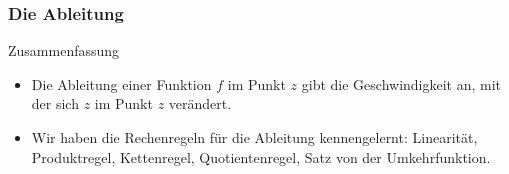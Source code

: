 \documentclass{beamer}
\renewcommand{\ae}{\"a}
\newcommand{\ue}{\"u}
\newcommand{\mytitle}{Die Ableitung}
\begin{document}
\begin{frame}\frametitle{\mytitle}
	\begin{block}{Zusammenfassung}
	\begin{itemize}
		\item Die Ableitung einer Funktion $f$ im Punkt $z$ gibt die Geschwindigkeit an, mit der sich $z$ im Punkt $z$ ver\ae ndert.
		\item Wir haben die Rechenregeln f\ue r die Ableitung kennengelernt: Linearit\ae t, Produktregel, Kettenregel, Quotientenregel, Satz von der Umkehrfunktion.
	\end{itemize}
	\end{block}
\end{frame}
\end{document}

